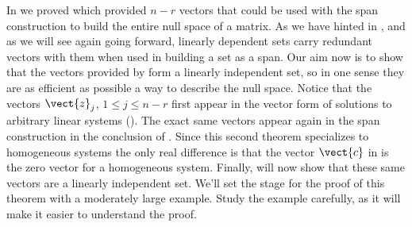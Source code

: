 In  we proved  which provided $n-r$ vectors that could be used with the span construction to build the entire null space of a matrix.  As we have hinted in , and as we will see again going forward, linearly dependent sets carry redundant vectors with them when used in building a set as a span.  Our aim now is to show that the vectors provided by  form a linearly independent set, so in one sense they are as efficient as possible a way to describe the null space.  Notice that the vectors $\vect{z}_j$, $1\leq j\leq n-r$ first appear in the vector form of solutions to arbitrary linear systems ().  The exact same vectors appear again in the span construction in the conclusion of .  Since this second theorem specializes to homogeneous systems the only real difference is that the vector $\vect{c}$ in  is the zero vector for a homogeneous system.  Finally,  will now show that these same vectors are a linearly independent set.  We'll set the stage for the proof of this theorem with a moderately large example.  Study the example carefully, as it will make it easier to understand the proof.\par
%
